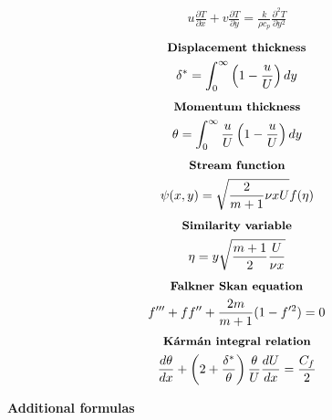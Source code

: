 \documentclass[10pt, a4paper]{article}
\newcommand{\derivative}[2]{\frac{\partial #1}{\partial #2}}
\begin{document}
\begin{multicols*}{2}
\begin{gather*}
        u\derivative{ T}{x} + v \derivative{ T}{y} =
        \frac{k}{\rho c_p} \derivative{^2 T}{y^2}
    \end{gather*}
    \begin{gather*}
        \textbf{\small Displacement thickness} \\
        \delta^* = \int_0^\infty\left( 1 - \frac{u}{U} \right)dy
    \end{gather*}
    \begin{gather*}
        \textbf{\small Momentum thickness} \\
        \theta = \int_0^\infty \frac{u}{U}\left( 1 - \frac{u}{U} \right)dy
    \end{gather*}
    \begin{gather*}
        \textbf{\small Stream function} \\
        \psi(x,y) = \sqrt{\frac{2}{m+1}\nu x U}f(\eta)
    \end{gather*}
    \begin{gather*}
        \textbf{\small Similarity variable} \\
        \eta = y \sqrt{\frac{m+1}{2}\frac{U}{\nu x}}
    \end{gather*}
    \begin{gather*}
        \textbf{\small Falkner Skan equation} \\
        f''' + ff'' + \frac{2m}{m+1}(1-f'^2)=0
    \end{gather*}
    \begin{gather*}
        \textbf{\small Kármán integral relation} \\
        \frac{d\theta}{dx} + \left( 2 + \frac{\delta^*}{\theta} \right)\frac{\theta}{U}\frac{dU}{dx} =
        \frac{C_f}{2}
    \end{gather*}
\end{multicols*}
\begin{center}
    \Large
    \textbf{Additional formulas}
    \vspace{0.5cm}
\end{center}
\end{document}
